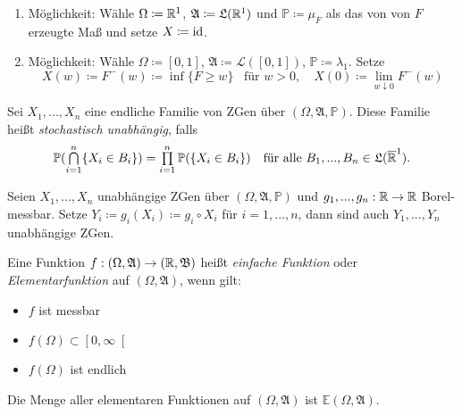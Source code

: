 \documentclass{cheat-sheet}
\newcommand{\Alg}{\mathfrak{A}} %
\newcommand{\LebAlg}{\mathfrak{L}} %
\renewcommand{\P}{\mathbb{P}} %
\newcommand{\E}{\mathbb{E}} %
\newcommand{\Bor}{\mathfrak{B}} %
\newcommand{\Leb}{\mathcal{L}} %
\begin{document}
\begin{beweis}
  \begin{enumerate}
    \item Möglichkeit: Wähle $\Omega \coloneqq \mathbb{R}^1$, $\Alg \coloneqq \LebAlg(\R^1)$ und $\P \coloneqq \mu_F$ als das von von $F$ erzeugte Maß und setze $X \coloneqq \mathrm{id}$.
    \item Möglichkeit: Wähle $\Omega \coloneqq [0,1]$, $\Alg \coloneqq \Leb([0,1])$, $\P \coloneqq \lambda_1$. Setze
    \[
      X(w) \coloneqq F^{-}(w) \coloneqq \inf \{ F \geq w \} \enspace \text{ für } w > 0, \quad
      X(0) \coloneqq \lim_{w \downarrow 0} F^{-}(w)
    \]
  \end{enumerate}
\end{beweis}




\begin{defn}
  Sei $X_1, ..., X_n$ eine endliche Familie von ZGen über $(\Omega, \Alg, \P)$. Diese Familie heißt \emph{stochastisch unabhängig}, falls
  \[ \P(\bigcap_{i=1}^n \{ X_i \in B_i \}) = \prod_{i=1}^n \P(\{ X_i \in B_i \}) \quad \text{für alle $B_1, ..., B_n \in \LebAlg(\ER^1)$.} \]
\end{defn}

\begin{satz}
  Seien $X_1, ..., X_n$ unabhängige ZGen über $(\Omega, \Alg, \P)$ und $g_1, ..., g_n : \mathbb{R} \to \mathbb{R}$ Borel-messbar. Setze $Y_i \coloneqq g_i(X_i) \coloneqq g_i \circ X_i$ für $i = 1, ..., n$, dann sind auch $Y_1, ..., Y_n$ unabhängige ZGen.
\end{satz}


\begin{defn}
  Eine Funktion $f : (\Omega, \Alg) \to (\R, \Bor)$ heißt \emph{einfache Funktion} oder \emph{Elementarfunktion} auf $(\Omega, \Alg)$, wenn gilt:
  \begin{multicols}{3}
    \begin{itemize}
      \item $f$ ist messbar
      \item $f(\Omega) \subset \left[0, \infty\right[$
      \item $f(\Omega)$ ist endlich
    \end{itemize}
  \end{multicols}
  Die Menge aller elementaren Funktionen auf $(\Omega, \Alg)$ ist $\E(\Omega, \Alg)$.
\end{defn}
\end{document}

